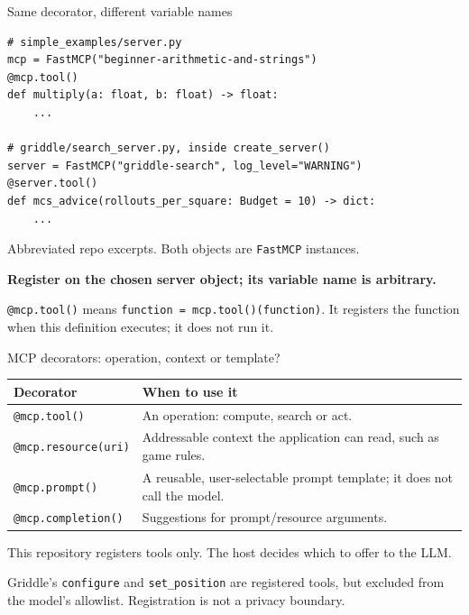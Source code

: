 \documentclass[aspectratio=169,11pt]{beamer}
\newcommand{\takeaway}[1]{\vspace{3mm}\begin{block}{}#1\end{block}}
\begin{document}
\begin{frame}[fragile]{Same decorator, different variable names}
\begin{lstlisting}[basicstyle=\ttfamily\footnotesize]
# simple_examples/server.py
mcp = FastMCP("beginner-arithmetic-and-strings")
@mcp.tool()
def multiply(a: float, b: float) -> float:
    ...

# griddle/search_server.py, inside create_server()
server = FastMCP("griddle-search", log_level="WARNING")
@server.tool()
def mcs_advice(rollouts_per_square: Budget = 10) -> dict:
    ...
\end{lstlisting}
\small Abbreviated repo excerpts. Both objects are \texttt{FastMCP} instances.
\par\vspace{2mm}\textbf{Register on the chosen server object; its variable name is arbitrary.}\par\vspace{2mm}
\small \texttt{@mcp.tool()} means \texttt{function = mcp.tool()(function)}.
It registers the function when this definition executes; it does not run it.
\end{frame}

\begin{frame}{MCP decorators: operation, context or template?}
\small
\begin{tabular}{p{}p{}}
\toprule Decorator & When to use it\\\midrule
\texttt{@mcp.tool()} & An operation: compute, search or act.\\[3mm]
\texttt{@mcp.resource(uri)} & Addressable context the application can read, such as game rules.\\[3mm]
\texttt{@mcp.prompt()} & A reusable, user-selectable prompt template; it does not call the model.\\[3mm]
\texttt{@mcp.completion()} & Suggestions for prompt/resource arguments.\\\bottomrule
\end{tabular}
\takeaway{This repository registers tools only. The host decides which to offer to the LLM.}
\small Griddle's \texttt{configure} and \texttt{set\_position} are registered tools,
but excluded from the model's allowlist. Registration is not a privacy boundary.
\end{frame}
\end{document}
